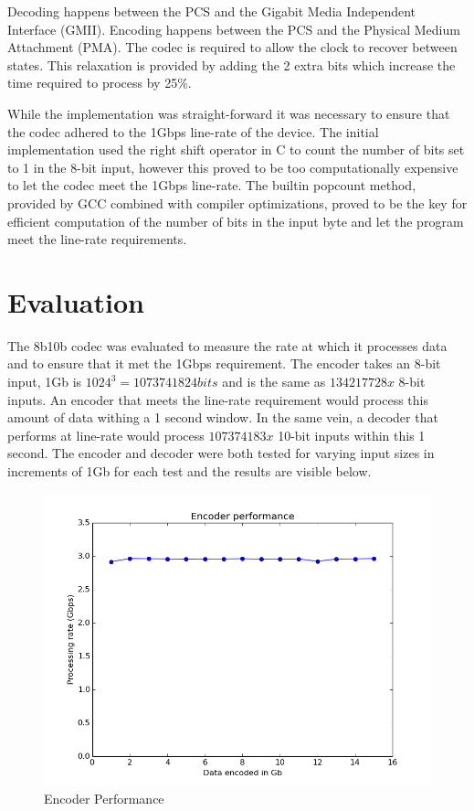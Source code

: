 \documentclass[conference]{IEEEtran}
\begin{document}
Decoding happens between the PCS and the Gigabit Media Independent Interface (GMII). Encoding happens between the PCS and the Physical Medium  Attachment (PMA). The codec is required to allow the clock to recover between states. This relaxation is provided by adding the 2 extra bits which increase the time required to process by 25\%.

While the implementation was straight-forward it was necessary to ensure that the codec adhered to the 1Gbps line-rate of the device. The initial implementation used the right shift operator in C to count the number of bits set to 1 in the 8-bit input, however this proved to be too computationally expensive to let the codec meet the 1Gbps line-rate. The builtin popcount method, provided by GCC combined with compiler optimizations, proved to be the key for efficient computation of the number of bits in the input byte and let the program meet the line-rate requirements.

\section{Evaluation}

The 8b10b codec was evaluated to measure the rate at which it processes data and to ensure that it met the 1Gbps requirement. The encoder takes an 8-bit input, 1Gb is $1024^3 = 1073741824bits$ and is the same as $134217728 x$ 8-bit inputs. An encoder that meets the line-rate requirement would process this amount of data withing a 1 second window. In the same vein, a decoder that performs at line-rate would process $107374183 x $ 10-bit inputs within this 1 second. The encoder and decoder were both tested for varying input sizes in increments of 1Gb for each test and the results are visible below.

\begin{figure}[h!]
  \centering
  \includegraphics[scale=0.50]{encoder_figure}
  \caption{Encoder Performance}
  \label{fig:encoder_performance}
\end{figure}
\end{document}
